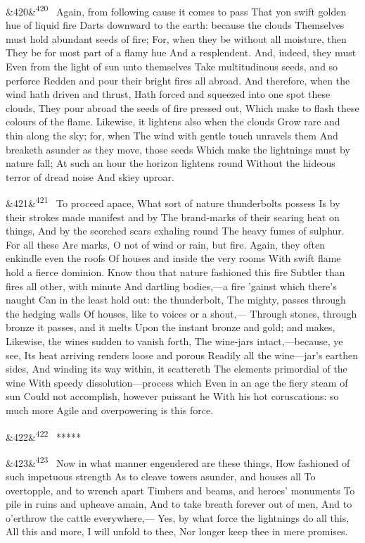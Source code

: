 \documentclass[12pt]{article}
\newcommand{\para}[1][]{\par\noindent\ifx&#1&\else\textsuperscript{\footnotesize #1}~\fi}
\begin{document}
\para[420] Again, from following cause it comes to pass That yon swift golden hue of liquid fire Darts downward to the earth: because the clouds Themselves must hold abundant seeds of fire; For, when they be without all moisture, then They be for most part of a flamy hue And a resplendent. And, indeed, they must Even from the light of sun unto themselves Take multitudinous seeds, and so perforce Redden and pour their bright fires all abroad. And therefore, when the wind hath driven and thrust, Hath forced and squeezed into one spot these clouds, They pour abroad the seeds of fire pressed out, Which make to flash these colours of the flame. Likewise, it lightens also when the clouds Grow rare and thin along the sky; for, when The wind with gentle touch unravels them And breaketh asunder as they move, those seeds Which make the lightnings must by nature fall; At such an hour the horizon lightens round Without the hideous terror of dread noise And skiey uproar.

\para[421] To proceed apace, What sort of nature thunderbolts possess Is by their strokes made manifest and by The brand-marks of their searing heat on things, And by the scorched scars exhaling round The heavy fumes of sulphur. For all these Are marks, O not of wind or rain, but fire. Again, they often enkindle even the roofs Of houses and inside the very rooms With swift flame hold a fierce dominion. Know thou that nature fashioned this fire Subtler than fires all other, with minute And dartling bodies,---a fire 'gainst which there's naught Can in the least hold out: the thunderbolt, The mighty, passes through the hedging walls Of houses, like to voices or a shout,--- Through stones, through bronze it passes, and it melts Upon the instant bronze and gold; and makes, Likewise, the wines sudden to vanish forth, The wine-jars intact,---because, ye see, Its heat arriving renders loose and porous Readily all the wine---jar's earthen sides, And winding its way within, it scattereth The elements primordial of the wine With speedy dissolution---process which Even in an age the fiery steam of sun Could not accomplish, however puissant he With his hot coruscations: so much more Agile and overpowering is this force.

\para[422] *****

\para[423] Now in what manner engendered are these things, How fashioned of such impetuous strength As to cleave towers asunder, and houses all To overtopple, and to wrench apart Timbers and beams, and heroes' monuments To pile in ruins and upheave amain, And to take breath forever out of men, And to o'erthrow the cattle everywhere,--- Yes, by what force the lightnings do all this, All this and more, I will unfold to thee, Nor longer keep thee in mere promises.
\end{document}
